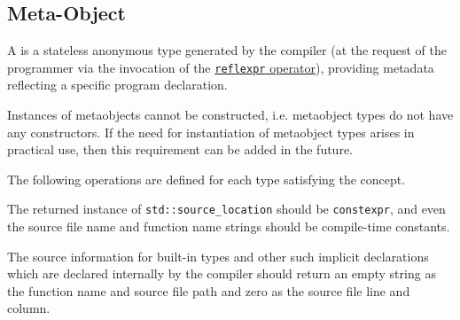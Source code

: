 \subsection{Meta-Object}
\label{concept-Meta-Object}

A  is a stateless anonymous type generated by the compiler
(at the request of the programmer via the invocation of the
\hyperref[section-reflection-operator]{\texttt{reflexpr} operator}),
providing metadata reflecting a specific program declaration.

Instances of metaobjects cannot be constructed, i.e. metaobject
types do not have any constructors.
If the need for instantiation of metaobject types arises in practical use,
then this requirement can be added in the future.





The following operations are defined for each type satisfying the 
concept.



The returned instance of \texttt{std::source\_location} should be \texttt{constexpr},
and even the source file name and function name strings should be compile-time constants.

The source information for built-in types and other
such implicit declarations which are declared internally by the compiler
should return an empty string as the function name and source file path and
zero as the source file line and column.
